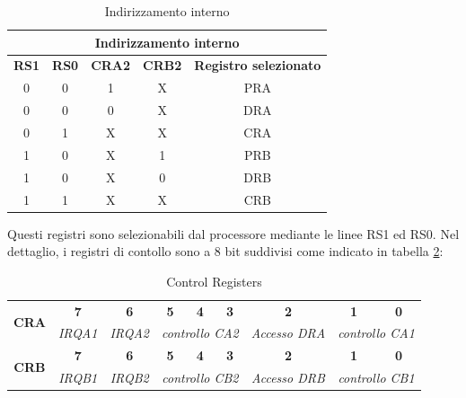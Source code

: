 \begin{table} [!h]
    \centering
    \begin{tabular}{|c|c|c|c|c|}
        \hline
        \multicolumn{5}{|c|}{\textbf{Indirizzamento interno}} \\ \hline
        \textbf{RS1} & \textbf{RS0} & \textbf{CRA2} & \textbf{CRB2} & \textbf{Registro selezionato}\\ \hline
        0       &0      &1      &X      &PRA    \\  \hline
        0       &0      &0      &X      &DRA    \\  \hline
        0       &1      &X      &X      &CRA    \\  \hline
        1       &0      &X      &1      &PRB    \\  \hline
        1       &0      &X      &0      &DRB    \\  \hline
        1       &1      &X      &X      &CRB    \\  \hline
    \end{tabular}
    \caption{Indirizzamento interno}
    \label{Tab:reg_ind_1}
\end{table}

Questi registri sono selezionabili dal processore mediante le linee RS1 ed RS0.
Nel dettaglio, i registri di contollo sono a 8 bit suddivisi come indicato in tabella \ref{Tab:control_registers}:

\begin{table}[!ht]
    \centering
    \renewcommand{\arraystretch}{1.5} %
    \setlength{\tabcolsep}{8pt} %
    \begin{tabular}{|c|c|c|c|c|c|c|c|c|}
        \hline
        \multirow{2}{*}{\textbf{CRA}} 
        & \textbf{7}  & \textbf{6}  & \textbf{5}  & \textbf{4}  & \textbf{3}  & \textbf{2}  & \textbf{1}  & \textbf{0}  \\ 
        \cline{2-9} 
        & \textit{IRQA1}  & \textit{IRQA2}  
        & \multicolumn{3}{c|}{\textit{controllo CA2}}  
        & \textit{Accesso DRA}  
        & \multicolumn{2}{c|}{\textit{controllo CA1}}  \\ 
        \hline
        \multirow{2}{*}{\textbf{CRB}}  
        & \textbf{7}  & \textbf{6}  & \textbf{5}  & \textbf{4}  & \textbf{3}  & \textbf{2}  & \textbf{1}  & \textbf{0}  \\ 
        \cline{2-9} 
        & \textit{IRQB1}  & \textit{IRQB2}  
        & \multicolumn{3}{c|}{\textit{controllo CB2}}  
        & \textit{Accesso DRB}  
        & \multicolumn{2}{c|}{\textit{controllo CB1}}  \\ 
        \hline
    \end{tabular}
    \caption{Control Registers}
    \label{Tab:control_registers}
\end{table}



